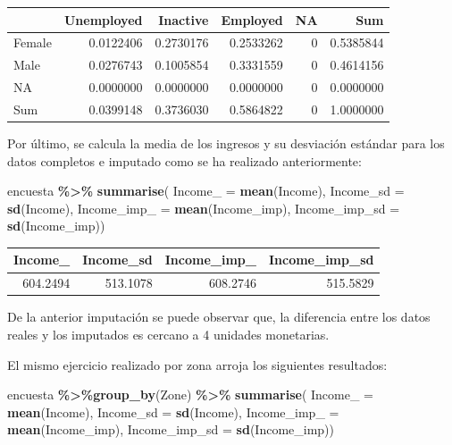 \documentclass[
  spanish,
  12pt,
]{book}
\newenvironment{Shaded}{\begin{snugshade}}{\end{snugshade}}
\newcommand{\AttributeTok}[1]{\textcolor[rgb]{0.13,0.29,0.53}{#1}}
\newcommand{\FunctionTok}[1]{\textcolor[rgb]{0.13,0.29,0.53}{\textbf{#1}}}
\newcommand{\NormalTok}[1]{#1}
\newcommand{\SpecialCharTok}[1]{\textcolor[rgb]{0.81,0.36,0.00}{\textbf{#1}}}
\begin{document}
\begin{tabular}{l|r|r|r|r|r}
\hline
  & Unemployed & Inactive & Employed & NA & Sum\\
\hline
Female & 0.0122406 & 0.2730176 & 0.2533262 & 0 & 0.5385844\\
\hline
Male & 0.0276743 & 0.1005854 & 0.3331559 & 0 & 0.4614156\\
\hline
NA & 0.0000000 & 0.0000000 & 0.0000000 & 0 & 0.0000000\\
\hline
Sum & 0.0399148 & 0.3736030 & 0.5864822 & 0 & 1.0000000\\
\hline
\end{tabular}

Por último, se calcula la media de los ingresos y su desviación estándar para los datos completos e imputado como se ha realizado anteriormente:

\begin{Shaded}
\begin{Highlighting}[]
\NormalTok{encuesta }\SpecialCharTok{\%\textgreater{}\%} \FunctionTok{summarise}\NormalTok{(}
  \AttributeTok{Income\_ =} \FunctionTok{mean}\NormalTok{(Income),}
  \AttributeTok{Income\_sd =} \FunctionTok{sd}\NormalTok{(Income),}
  \AttributeTok{Income\_imp\_ =} \FunctionTok{mean}\NormalTok{(Income\_imp),}
  \AttributeTok{Income\_imp\_sd =} \FunctionTok{sd}\NormalTok{(Income\_imp))}
\end{Highlighting}
\end{Shaded}

\begin{tabular}{r|r|r|r}
\hline
Income\_ & Income\_sd & Income\_imp\_ & Income\_imp\_sd\\
\hline
604.2494 & 513.1078 & 608.2746 & 515.5829\\
\hline
\end{tabular}

De la anterior imputación se puede observar que, la diferencia entre los datos reales y los imputados es cercano a 4 unidades monetarias.

El mismo ejercicio realizado por zona arroja los siguientes resultados:

\begin{Shaded}
\begin{Highlighting}[]
\NormalTok{encuesta }\SpecialCharTok{\%\textgreater{}\%}\FunctionTok{group\_by}\NormalTok{(Zone) }\SpecialCharTok{\%\textgreater{}\%}  \FunctionTok{summarise}\NormalTok{(}
  \AttributeTok{Income\_ =} \FunctionTok{mean}\NormalTok{(Income),}
  \AttributeTok{Income\_sd =} \FunctionTok{sd}\NormalTok{(Income),}
  \AttributeTok{Income\_imp\_ =} \FunctionTok{mean}\NormalTok{(Income\_imp),}
  \AttributeTok{Income\_imp\_sd =} \FunctionTok{sd}\NormalTok{(Income\_imp))}
\end{Highlighting}
\end{Shaded}
\end{document}
